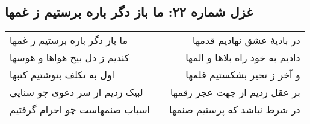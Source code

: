 \begin{center}
\section*{غزل شماره ۲۲: ما باز دگر باره برستیم ز غمها}
\label{sec:022}
\begin{longtable}{l p{0.5cm} r}
ما باز دگر باره برستیم ز غمها
&&
در بادیهٔ عشق نهادیم قدمها
\\
کندیم ز دل بیخ هواها و هوسها
&&
دادیم به خود راه بلاها و المها
\\
اول به تکلف بنوشتیم کتبها
&&
و آخر ز تحیر بشکستیم قلمها
\\
لبیک زدیم از سر دعوی چو سنایی
&&
بر عقل زدیم از جهت عجز رقمها
\\
اسباب صنمهاست چو احرام گرفتیم
&&
در شرط نباشد که پرستیم صنمها
\\
\end{longtable}
\end{center}
